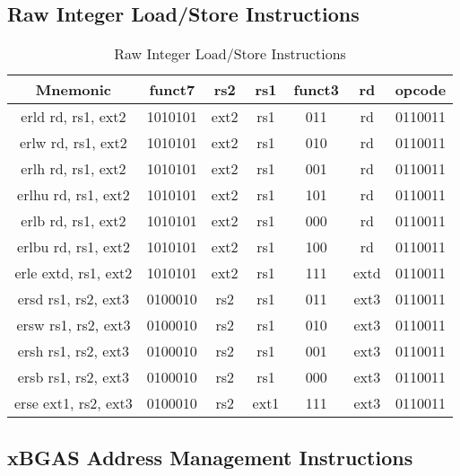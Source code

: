 \documentclass{article}
\begin{document}
\newpage
\subsection{Raw Integer Load/Store Instructions}

\begin{center}
\begin{small}

\begin{table}[H]
\caption{Raw Integer Load/Store Instructions}
\begin{center}
\begin{tabular}{| c | c | c | c | c | c | c |}
\hline
Mnemonic & funct7 & rs2 & rs1 & funct3 & rd & opcode \\ \hline
\hline
erld rd, rs1, ext2 & 1010101 & ext2 & rs1 & 011 & rd & 0110011\\
\hline
erlw rd, rs1, ext2 & 1010101 & ext2 & rs1 & 010 & rd & 0110011\\
\hline
erlh rd, rs1, ext2 & 1010101 & ext2 & rs1 & 001 & rd & 0110011\\
\hline
erlhu rd, rs1, ext2 & 1010101 & ext2 & rs1 & 101 & rd & 0110011\\
\hline
erlb rd, rs1, ext2 & 1010101 & ext2 & rs1 & 000 & rd & 0110011\\
\hline
erlbu rd, rs1, ext2 & 1010101 & ext2 & rs1 & 100 & rd & 0110011\\
\hline
erle extd, rs1, ext2 & 1010101 & ext2 & rs1 & 111 & extd & 0110011\\
\hline
ersd rs1, rs2, ext3 & 0100010 &  rs2 & rs1 & 011 & ext3 & 0110011\\
\hline
ersw rs1, rs2, ext3 & 0100010 &  rs2 & rs1 & 010 & ext3 & 0110011\\
\hline
ersh rs1, rs2, ext3 & 0100010 &  rs2 & rs1 & 001 & ext3 & 0110011\\
\hline
ersb rs1, rs2, ext3 & 0100010 &  rs2 & rs1 & 000 & ext3 & 0110011\\
\hline
erse ext1, rs2, ext3 & 0100010 &  rs2 & ext1 & 111 & ext3 & 0110011\\
\hline
\end{tabular}
\end{center}
\end{table}

\end{small}
\end{center}

\newpage
\subsection{xBGAS Address Management Instructions}
\end{document}
